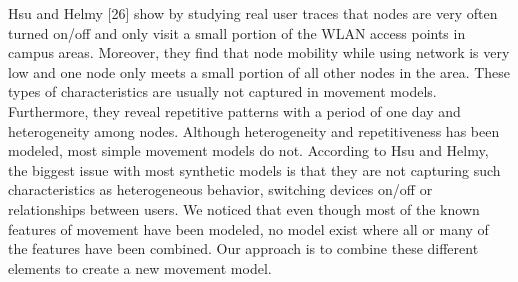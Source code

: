 Hsu and Helmy [26] show by studying real user traces that nodes are very often turned
on/off and only visit a small portion of the WLAN access points in campus areas.
Moreover, they find that node mobility while using network is very low and one node
only meets a small portion of all other nodes in the area. These types of characteristics
are usually not captured in movement models. Furthermore, they reveal repetitive
patterns with a period of one day and heterogeneity among nodes. Although
heterogeneity and repetitiveness has been modeled, most simple movement models do
not. According to Hsu and Helmy, the biggest issue with most synthetic models is that
they are not capturing such characteristics as heterogeneous behavior, switching
devices on/off or relationships between users.
We noticed that even though most of the known features of movement have been
modeled, no model exist where all or many of the features have been combined. Our
approach is to combine these different elements to create a new movement model.


